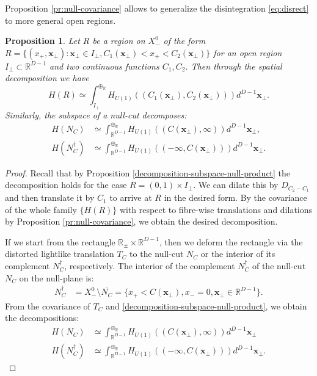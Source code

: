 \documentclass[12pt]{article}
\def\RR{{\mathbb R}}
\newtheorem{proposition}[theorem]{Proposition}
\theoremstyle{remark}
\begin{document}
Proposition \ref{pr:null-covariance} allows to generalize the disintegration \eqref{eq:disrect} to more general open regions.

\begin{proposition}\label{decomposition-subspace-null-general}
Let $R$ be a region on $X_-^0$ of the form $R = \{(x_+, \pmb{x}_\perp): \pmb{x}_\perp \in I_\perp, C_1(\pmb{x}_\perp) < x_+ < C_2(\pmb{x}_\perp)\}$
for an open region $I_\perp \subset \RR^{D-1}$ and two continuous functions $C_1, C_2$.
Then through the spatial decomposition we have
\[
  H(R) \simeq \int^{\oplus_\RR}_{I_\perp} H_{U(1)}\left((C_1(\pmb{x}_\perp),C_2(\pmb{x}_\perp))\right)d^{D-1}\pmb{x}_\perp.
\]
Similarly, the subspace of a null-cut decomposes:
	\begin{align*}
		H(N_C)&\simeq\int^{\oplus_\RR}_{\RR^{D-1}}H_{U(1)}((C(\pmb{x}_\perp),\infty))d^{D-1}\pmb{x}_\perp, \\
		H(N_{C}^\dagger)&\simeq\int^{\oplus_\RR}_{\RR^{D-1}} H_{U(1)}\left( (-\infty, C(\pmb{x}_\perp))  \right)d^{D-1}\pmb{x}_\perp.
	\end{align*}
\end{proposition}
\begin{proof}
Recall that by Proposition \ref{decomposition-subspace-null-product} the decomposition holds
for the case $R = (0,1)\times I_\perp$.
We can dilate this by $D_{C_2-C_1}$ and then translate it by $C_1$ to arrive at $R$ in the desired form.
By the covariance of the whole family $\{H(R)\}$ with respect to fibre-wise translations and dilations by Proposition \ref{pr:null-covariance},
we obtain the desired decomposition.

If we start from the rectangle $\RR_{\pm}\times \RR^{D-1}$, then we deform the rectangle via the distorted lightlike translation $T_C$ to the null-cut $N_C$
or the interior of its complement $N_C^\dagger$, respectively. The interior of the complement $N_{C}^\dagger$ of the null-cut $N_{C}$ on the null-plane is:
	\begin{align*}
		N_C^\dagger&=X_-^0\setminus \overline{N_C} =\{ x_+<C(\pmb{x}_\perp),x_-=0, \pmb{x}_\perp\in\mathbb{R}^{D-1}  \}.
	\end{align*}
From the covariance of $T_C$ and \autoref{decomposition-subspace-null-product}, we obtain the decompositions:
	\begin{align}
		H(N_{C})&\simeq \int^{\oplus_\RR}_{\RR^{D-1}}H_{U(1)}((C(\pmb{x}_\perp),\infty))d^{D-1}\pmb{x}_\perp\nonumber\\
		H(N_{C}^\dagger)&\simeq\int^{\oplus_\RR}_{\RR^{D-1}} H_{U(1)}\left( (-\infty, C(\pmb{x}_\perp))  \right)d^{D-1}\pmb{x}_\perp\label{decomposition-subspace-complement-null-cut}.
	\end{align}
\end{proof}
\end{document}

